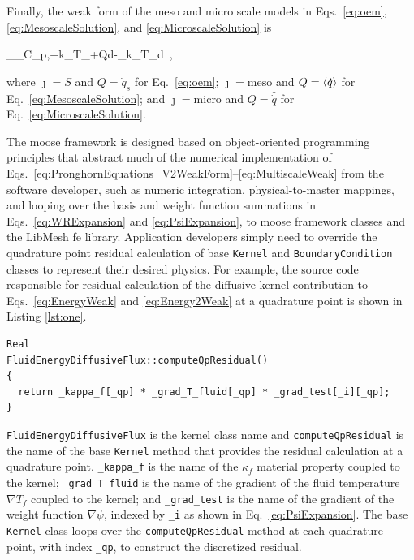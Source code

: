 Finally, the weak form of the meso and micro scale models in Eqs.\ \eqref{eq:oem}, \eqref{eq:MesoscaleSolution}, and \eqref{eq:MicroscaleSolution} is

\beq
\label{eq:MultiscaleWeak}
\int_\Omega\left\lbrack\rho_\jmath C_{p,\jmath}\psi+k_\jmath\nabla T_\jmath\cdot\nabla\psi+Q\psi\right\rbrack d\Omega-\int_\Gamma k_\jmath\nabla T_\jmath\cdot{}\psi d\ ,
\eeq

\noindent where \(\jmath=S\) and \(Q=\dot{q}_s\) for Eq.\ \eqref{eq:oem}; \(\jmath=\text{meso}\) and \(Q=\langle\dot{q}\rangle\) for Eq.\ \eqref{eq:MesoscaleSolution}; and \(\jmath=\text{micro}\) and \(Q=\hat{\dot{q}}\) for Eq.\ \eqref{eq:MicroscaleSolution}.

The \gls{moose} framework is designed based on object-oriented programming principles that abstract much of the numerical implementation of Eqs.\ \eqref{eq:PronghornEquations_V2WeakForm}--\eqref{eq:MultiscaleWeak} from the software developer, such as numeric integration, physical-to-master mappings, and looping over the basis and weight function summations in Eqs.\ \eqref{eq:WRExpansion} and \eqref{eq:PsiExpansion}, to \gls{moose} framework classes and the LibMesh \gls{fe} library. Application developers simply need to override the quadrature point residual calculation of base \texttt{Kernel} and \texttt{BoundaryCondition} classes to represent their desired physics. For example, the source code responsible for residual calculation of the diffusive kernel contribution to Eqs.\ \eqref{eq:EnergyWeak} and \eqref{eq:Energy2Weak} at a quadrature point is shown in Listing \ref{lst:one}.

\vspace{1em}
\begin{minipage}[c]{0.92\linewidth}
\begin{lstlisting}[caption={Pronghorn source code calculation of \(\int_\Omega\kappa_f\nabla T_f\cdot\nabla\psi d\Omega\).},captionpos=b,label={lst:one}]
Real
FluidEnergyDiffusiveFlux::computeQpResidual()
{
  return _kappa_f[_qp] * _grad_T_fluid[_qp] * _grad_test[_i][_qp];
}
\end{lstlisting}
\end{minipage}

\texttt{FluidEnergyDiffusiveFlux} is the kernel class name and \texttt{computeQpResidual} is the name of the base \texttt{Kernel} method that provides the residual calculation at a quadrature point. \texttt{\_kappa\_f} is the name of the \(\kappa_f\) material property coupled to the kernel; \texttt{\_grad\_T\_fluid} is the name of the gradient of the fluid temperature \(\nabla T_f\) coupled to the kernel; and \texttt{\_grad\_test} is the name of the gradient of the weight function \(\nabla\psi\), indexed by \texttt{\_i} as shown in Eq.\ \eqref{eq:PsiExpansion}. The base \texttt{Kernel} class loops over the \texttt{computeQpResidual} method at each quadrature point, with index \texttt{\_qp}, to construct the discretized residual.


